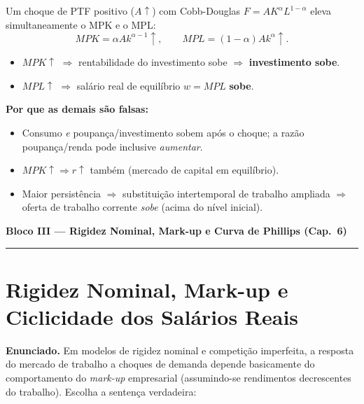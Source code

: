 \documentclass[12pt, a4paper]{article}
\begin{document}
\begin{correctbox}[title={Resposta correta: b)}]
Um choque de PTF positivo ($A\uparrow$) com Cobb-Douglas $F = AK^\alpha L^{1-\alpha}$ eleva simultaneamente o MPK e o MPL:
\[
MPK = \alpha A k^{\alpha-1} \uparrow,
\qquad
MPL = (1-\alpha)A k^{\alpha} \uparrow.
\]
\begin{itemize}[leftmargin=*]
\item $MPK\uparrow$ $\Rightarrow$ rentabilidade do investimento sobe
  $\Rightarrow$ \textbf{investimento sobe}. \checkmark
\item $MPL\uparrow$ $\Rightarrow$ salário real de equilíbrio $w = MPL$
  \textbf{sobe}. \checkmark
\end{itemize}

\textbf{Por que as demais são falsas:}
\begin{itemize}[leftmargin=*]
\item[a)] Consumo \emph{e} poupança/investimento sobem após o choque;
a razão poupança/renda pode inclusive \emph{aumentar}.
\item[c)] $MPK\uparrow \Rightarrow r\uparrow$ também (mercado de capital em equilíbrio).
\item[d)] Maior persistência $\Rightarrow$ substituição intertemporal de trabalho ampliada
$\Rightarrow$ oferta de trabalho corrente \emph{sobe} (acima do nível inicial).
\end{itemize}
\end{correctbox}

\newpage
\begin{center}
{\large\bfseries\color{cyanrbc}
  Bloco III --- Rigidez Nominal, Mark-up e Curva de Phillips (Cap.\ 6)}\\[0.2em]
\rule{\linewidth}{0.6pt}
\end{center}

\section{Rigidez Nominal, Mark-up e Ciclicidade dos Salários Reais}

\textbf{Enunciado.} Em modelos de rigidez nominal e competição imperfeita, a resposta do mercado de trabalho a choques de demanda depende basicamente do comportamento do \textit{mark-up} empresarial (assumindo-se rendimentos decrescentes do trabalho). Escolha a sentença verdadeira:
\end{document}
